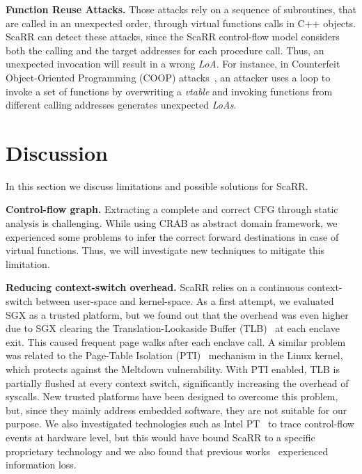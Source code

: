 \textbf{Function Reuse Attacks.}
Those attacks rely on a sequence of subroutines, that are called in an 
unexpected order, \eg through virtual functions calls in C++ objects. ScaRR can 
detect these attacks, since the ScaRR control-flow model considers both the 
calling and the target addresses for each procedure call. Thus, an unexpected 
invocation will result in a wrong \emph{LoA}.
For instance, in Counterfeit Object-Oriented Programming (COOP) 
attacks~\cite{schuster2015counterfeit}, an attacker uses a loop to invoke a set 
of functions by overwriting a \emph{vtable} and invoking functions from 
different calling addresses generates unexpected \emph{LoAs}.

\section{Discussion}
\label{sec:discussion_scarr}
In this section we discuss limitations and possible solutions for ScaRR.

\textbf{Control-flow graph.}
Extracting a complete and correct CFG through static analysis is challenging.
While using CRAB as abstract domain framework, we experienced some problems
to infer the correct forward destinations in case of virtual functions. Thus, 
we will investigate new techniques to mitigate this limitation.

\textbf{Reducing context-switch overhead.}
ScaRR relies on a continuous context-switch between user-space and kernel-space.
As a first attempt, we evaluated SGX as a trusted platform, but we found out 
that the overhead was even higher due to SGX clearing the Translation-Lookaside 
Buffer (TLB)~\cite{stravers2013translation} at each enclave exit.
This caused frequent page walks after each enclave call.
A similar problem was related to the Page-Table Isolation 
(PTI)~\cite{watson2018capability} mechanism in the Linux kernel, which protects 
against the Meltdown vulnerability. 
With PTI enabled, TLB is partially flushed at every context switch, 
significantly increasing the overhead of syscalls.
New trusted platforms have been designed to overcome this problem, but, since 
they mainly address embedded software, they are not suitable for our purpose.
We also investigated technologies such as Intel 
PT~\cite{Ge:2017:GGC:3037697.3037716} to trace 
control-flow events at hardware level, but this would have bound ScaRR to a 
specific proprietary technology and we also found that previous 
works~\cite{Ge:2017:GGC:3037697.3037716,Hu:2018:EUC:3243734.3243797} 
experienced information loss.

